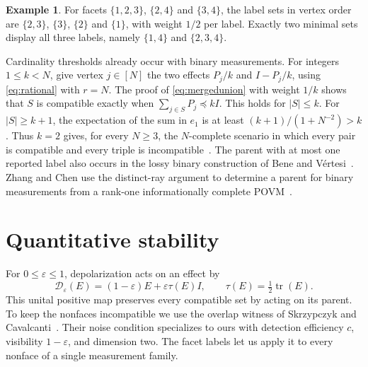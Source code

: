 \documentclass[11pt,a4paper]{article}
\theoremstyle{definition}
\newtheorem*{example}{Example}
\newcommand{\Id}{I}
\newcommand{\tr}{\operatorname{tr}}
\newcommand{\D}{\mathcal D}
\begin{document}
\begin{example}
For facets \(\{1,2,3\}\), \(\{2,4\}\) and \(\{3,4\}\), the label sets
in vertex order are \(\{2,3\}\), \(\{3\}\), \(\{2\}\) and \(\{1\}\),
with weight \(1/2\) per label. Exactly two minimal sets display all three
labels, namely \(\{1,4\}\) and \(\{2,3,4\}\).
\end{example}

Cardinality thresholds already occur with binary measurements. For integers
\(1\le k<N\), give vertex \(j\in[N]\) the two effects \(P_j/k\) and
\(\Id-P_j/k\), using \eqref{eq:rational} with \(r=N\). The proof of
\eqref{eq:mergedunion} with weight \(1/k\) shows that \(S\) is compatible
exactly when \(\sum_{j\in S}P_j\preceq k\Id\). This holds for \(|S|\le k\).
For \(|S|\ge k+1\), the expectation of the sum in \(e_1\) is at least
\((k+1)/(1+N^{-2})>k\). Thus \(k=2\) gives, for every \(N\ge3\), the
\(N\)-complete scenario in which every pair is compatible and every triple
is incompatible~\cite[Example~3 and Sec.~VI]{AK}. The parent with at most one
reported label also occurs in the lossy binary construction of Bene and
V\'ertesi~\cite[Sec.~IV]{BV}. Zhang and Chen use the distinct-ray argument
to determine a parent for binary measurements from a rank-one
informationally complete POVM~\cite{ZC}.

\section{Quantitative stability}
For \(0\le\varepsilon\le1\), depolarization acts on an effect by
\[
   \D_\varepsilon(E)=(1-\varepsilon)E+\varepsilon\tau(E)\Id,
   \qquad \tau(E)=\tfrac12\tr(E).
\]
This unital positive map preserves every compatible set by acting on its
parent. To keep the nonfaces incompatible we use the overlap witness of
Skrzypczyk and Cavalcanti~\cite[Secs.~IV--V and Eq.~(12)]{SC}.
Their noise condition specializes to ours with detection efficiency
\(c\), visibility \(1-\varepsilon\), and dimension two. The facet labels
let us apply it to every nonface of a single measurement family.
\end{document}

